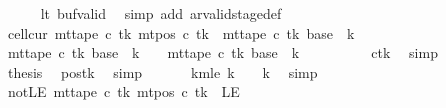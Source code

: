 \begin{isabellebody}
\ \ \ \ \isamarkupfalse%
\ lt{}\ buf{\isacharunderscore}{\kern0pt}valid\ \isamarkupfalse%
\ {\isacharparenleft}{\kern0pt}simp\ add{\isacharcolon}{\kern0pt}\ ar{\isacharunderscore}{\kern0pt}valid{\isacharunderscore}{\kern0pt}stage{\isacharunderscore}{\kern0pt}def{\isacharparenright}{\kern0pt}\isanewline
\ \ \isamarkupfalse%
\ cell{\isacharunderscore}{\kern0pt}cur{\isacharcolon}{\kern0pt}\ {\isachardoublequoteopen}mt{\isacharunderscore}{\kern0pt}tape\ c{}\ tk\ {\isacharparenleft}{\kern0pt}mt{\isacharunderscore}{\kern0pt}pos\ c{}\ tk{\isacharparenright}{\kern0pt}\ {\isacharequal}{\kern0pt}\ mt{\isacharunderscore}{\kern0pt}tape\ c{\isacharprime}{\kern0pt}\ tk\ {\isacharparenleft}{\kern0pt}base\ {\isacharplus}{\kern0pt}\ {\isacharparenleft}{\kern0pt}{\isacharquery}{\kern0pt}k\ {\isacharminus}{\kern0pt}\ {}{\isacharparenright}{\kern0pt}{\isacharparenright}{\kern0pt}{\isachardoublequoteclose}\isanewline
\ \ \isamarkupfalse%
\ {\isacharminus}{\kern0pt}\isanewline
\ \ \ \ \isamarkupfalse%
\ {\isachardoublequoteopen}mt{\isacharunderscore}{\kern0pt}tape\ c{}\ tk\ {\isacharparenleft}{\kern0pt}base\ {\isacharplus}{\kern0pt}\ {\isacharparenleft}{\kern0pt}{\isacharquery}{\kern0pt}k\ {\isacharminus}{\kern0pt}\ {}{\isacharparenright}{\kern0pt}{\isacharparenright}{\kern0pt}\ {\isacharequal}{\kern0pt}\ mt{\isacharunderscore}{\kern0pt}tape\ c{\isacharprime}{\kern0pt}\ tk\ {\isacharparenleft}{\kern0pt}base\ {\isacharplus}{\kern0pt}\ {\isacharparenleft}{\kern0pt}{\isacharquery}{\kern0pt}k\ {\isacharminus}{\kern0pt}\ {}{\isacharparenright}{\kern0pt}{\isacharparenright}{\kern0pt}{\isachardoublequoteclose}\isanewline
\ \ \ \ \ \ \isamarkupfalse%
\ c{}tk\ \isamarkupfalse%
\ simp\isanewline
\ \ \ \ \isamarkupfalse%
\ {\isacharquery}{\kern0pt}thesis\ \isamarkupfalse%
\ pos{}{\isacharunderscore}{\kern0pt}tk\ \isamarkupfalse%
\ simp\isanewline
\ \ \isamarkupfalse%
\isanewline
\ \ \isamarkupfalse%
\ km{}le{\isacharcolon}{\kern0pt}\ {\isachardoublequoteopen}{\isacharquery}{\kern0pt}k\ {\isacharminus}{\kern0pt}\ {}\ {\isasymle}\ {\isacharquery}{\kern0pt}k{\isachardoublequoteclose}\ \isamarkupfalse%
\ simp\isanewline
\ \ \isamarkupfalse%
\ notLE{}{\isacharcolon}{\kern0pt}\ {\isachardoublequoteopen}mt{\isacharunderscore}{\kern0pt}tape\ c{}\ tk\ {\isacharparenleft}{\kern0pt}mt{\isacharunderscore}{\kern0pt}pos\ c{}\ tk{\isacharparenright}{\kern0pt}\ {\isasymnoteq}\ LE{}{\isachardoublequoteclose}\isanewline

\end{isabellebody}
